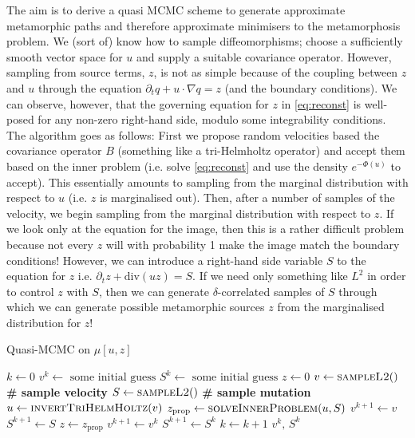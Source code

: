 \documentclass{article}
\begin{document}
The aim is to derive a quasi MCMC scheme to generate approximate metamorphic
paths and therefore
approximate minimisers to the metamorphosis problem. We (sort of) know how to
sample diffeomorphisms; choose a sufficiently smooth vector space for $u$ and
supply a suitable covariance operator. However, sampling from source terms, $z$,
is not as simple because of the coupling between $z$ and $u$ through the
equation $\partial_t q + u\cdot\nabla q = z$ (and the boundary conditions).  We
can observe, however, that the governing equation for $z$ in \eqref{eq:reconst}
is well-posed for any non-zero right-hand side, modulo some integrability
conditions. The algorithm goes as follows: First we propose random velocities
based the covariance operator $B$ (something like a tri-Helmholtz operator) and
accept them based on the inner problem (i.e.  solve \eqref{eq:reconst} and use
the density $e^{-\Phi(u)}$ to accept). This essentially amounts to sampling from
the marginal distribution with respect to $u$ (i.e. $z$ is marginalised out).
Then, after a number of samples of the velocity, we begin sampling from the
marginal distribution with respect to $z$. If we look only at the equation for
the image, then this is a rather difficult problem because not every $z$ will
with probability 1 make the image match the boundary conditions! However, we
can introduce a right-hand side variable $S$ to the equation for $z$ i.e.
$\partial_t z + \text{div}(u z) = S$. If we need only something like $L^2$ in
order to control $z$ with $S$, then we can generate $\delta$-correlated samples
of $S$ through which we can generate possible metamorphic sources $z$ from the
marginalised distribution for $z$!\\

\newcommand{\mhsample}{\textsc{sampleL2}}
\newcommand{\inverthh}{\textsc{invertTriHelmHoltz}}
\newcommand{\acceptprob}{\textsc{acceptanceProbability}}
\newcommand{\solveinner}{\textsc{solveInnerProblem}}
\begin{algorithm}
\begin{algorithmic}
\caption{Quasi-MCMC on $\mu[u,z]$}
\State $k \gets 0$
\State $v^k \gets \text{ some initial guess}$
\State $S^k \gets \text{ some initial guess}$
\State $z \gets 0$
\State $v \gets \mhsample ()$\hspace{3cm} \textbf{\# sample velocity}
\State $S \gets \mhsample ()$\hspace{3cm} \textbf{\# sample mutation}
\State $u \gets \inverthh (v)$
\State $z_\text{prop} \gets \solveinner (u, S)$
\If {\textsc{randomUnit()}$\,< \acceptprob(z_\text{prop}, z)$}
    \State $v^{k+1} \gets v$
    \State $S^{k+1} \gets S$
    \State $z \gets z_\text{prop}$
\Else
    \State $v^{k+1} \gets v^k$
    \State $S^{k+1} \gets S^k$
\EndIf
\State $k\gets k+1$
\EndWhile
\Return $v^k,\, S^k$
\EndProcedure
\end{algorithmic}
\end{algorithm}
\end{document}
